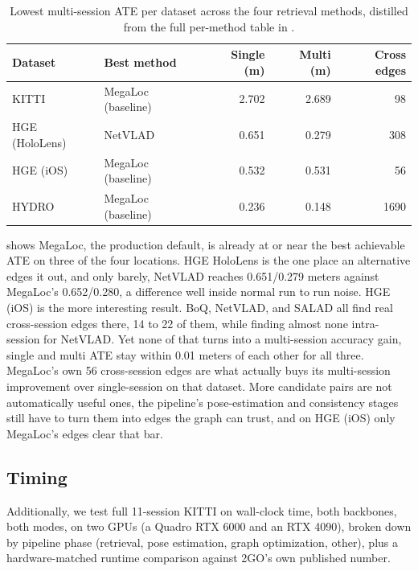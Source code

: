 \begin{table}[htb]
  \centering
  \footnotesize
  \begin{tabular*}{\textwidth}{@{\extracolsep{\fill}} llrrr}
  \hline
  \textbf{Dataset} & \textbf{Best method} & \textbf{Single (m)} & \textbf{Multi (m)} & \textbf{Cross edges} \\
  \hline
  KITTI & MegaLoc (baseline) & 2.702 & 2.689 & 98 \\
  HGE (HoloLens) & NetVLAD & 0.651 & 0.279 & 308 \\
  HGE (iOS) & MegaLoc (baseline) & 0.532 & 0.531 & 56 \\
  HYDRO & MegaLoc (baseline) & 0.236 & 0.148 & 1690 \\
  \hline
  \end{tabular*}
  \caption[Retrieval-method summary, best method per dataset]{Lowest multi-session ATE per
    dataset across the four retrieval methods, distilled from the full per-method table in
    .}
  \label{tab:ablation-retrieval-summary}
\end{table}

 shows MegaLoc, the production default, is already at or
near the best achievable ATE on three of the four locations. HGE HoloLens is the one place an alternative edges it out, and only barely, NetVLAD
reaches 0.651/0.279 meters against MegaLoc's 0.652/0.280, a difference well inside normal run to
run noise. HGE (iOS) is the more interesting result. BoQ, NetVLAD, and SALAD all find real
cross-session edges there, 14 to 22 of them, while finding almost none intra-session for NetVLAD.
Yet none of that turns into a multi-session accuracy gain, single and multi ATE stay within
0.01 meters of each other for all three. MegaLoc's own 56 cross-session edges are what actually
buys its multi-session improvement over single-session on that dataset. More candidate pairs are
not automatically useful ones, the pipeline's pose-estimation and consistency stages still have to
turn them into edges the graph can trust, and on HGE (iOS) only MegaLoc's edges clear that bar.

\subsection{Timing}
\label{sec:experiments-ablation-timing}

Additionally, we test full 11-session KITTI on wall-clock time, both backbones, both modes, on two GPUs (a Quadro RTX 6000 and an RTX 4090), broken down by pipeline phase (retrieval, pose estimation, graph optimization, other), plus a hardware-matched runtime comparison against 2GO's own published number.

